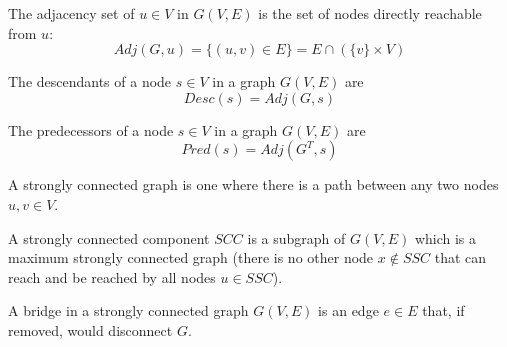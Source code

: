 \begin{definition}
    The adjacency set of $u \in V$ in $G(V,E)$ is the set of nodes directly reachable from $u$:
    \begin{equation*}
        Adj(G, u) = \{(u, v) \in E\} = E \cap (\{v\}\times V)
    \end{equation*}
\end{definition}
\begin{definition}[Descendants] The descendants of a node $s \in V$ in a graph $G(V,E)$ are
    \begin{equation*}
        Desc(s) = Adj(G, s)
    \end{equation*}
\end{definition}
\begin{definition}[Predecessors] The predecessors of a node $s \in V$ in a graph $G(V,E)$ are
    \begin{equation*}
        Pred(s) = Adj(G^T, s)
    \end{equation*}
\end{definition}
\begin{definition}
    A strongly connected graph is one where there is a path between any two nodes $u, v \in V$.
\end{definition}
\begin{definition}
    A strongly connected component $SCC$ is a subgraph of $G(V, E)$ which is a maximum strongly connected graph (there is no other node $x \not \in SSC$ that can reach and be reached by all nodes $u \in SSC$).
\end{definition}
\begin{definition}[Bridge]
    A bridge in a strongly connected graph $G(V,E)$ is an edge $e \in E$ that, if removed, would disconnect $G$.
\end{definition}

